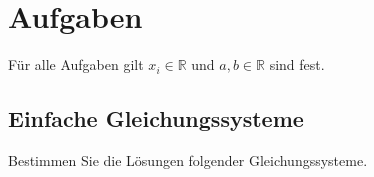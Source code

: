 		
		

		
	
	\newpage
	\section{Aufgaben}
	
		F\"ur alle Aufgaben gilt $ x_i \in \mathbb{R} $ und $ a, b \in \mathbb{R} $ sind fest.
		
		\subsection{Einfache Gleichungssysteme}
			Bestimmen Sie die L\"osungen folgender Gleichungssysteme.

